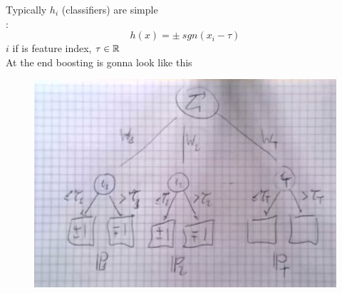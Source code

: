 \documentclass[../main.tex]{subfiles}
\begin{document}
Typically $h_i$ (classifiers) are simple
\\
:
$$
h(x) = \pm \ sgn (x_i- \tau)
$$
$i$ if is feature index, $\tau \in \mathbb{R}$\\
At the end boosting is gonna look like this
\\
\begin{figure}[h]
    \centering
    \includegraphics[width=0.5\linewidth]{../img/lez23-img5.JPG}
    \caption{}
\end{figure}\\
\end{document}
